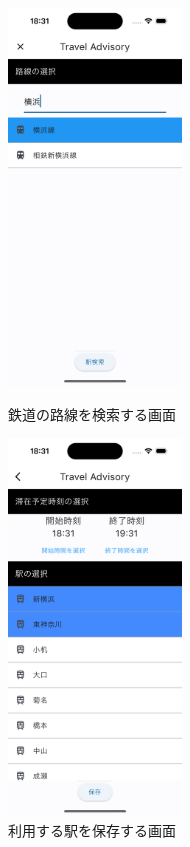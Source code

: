 \begin{figure}[H]
  \begin{minipage}[b]{0.45\linewidth}
    \centering
    \includegraphics[height=10cm]{./fig/railway_search.png}
    \caption{鉄道の路線を検索する画面}
    \label{fig:railway_search}
  \end{minipage}
  \begin{minipage}[b]{0.45\linewidth}
    \centering
    \includegraphics[height=10cm]{./fig/trans_data_save.png}
    \caption{利用する駅を保存する画面}
    \label{fig:trans_data_save}
  \end{minipage}
\end{figure}

